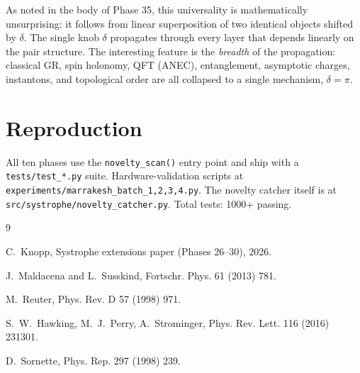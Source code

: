 \documentclass[11pt,a4paper]{article}
\begin{document}
As noted in the body of Phase 35, this universality is mathematically
unsurprising: it follows from linear superposition of two identical
objects shifted by $\delta$. The single knob $\delta$ propagates
through every layer that depends linearly on the pair structure.
The interesting feature is the \emph{breadth} of the propagation:
classical GR, spin holonomy, QFT (ANEC), entanglement, asymptotic
charges, instantons, and topological order are all collapsed to a
single mechanism, $\delta = \pi$.

\section{Reproduction}

All ten phases use the \texttt{novelty\_scan()} entry point and ship
with a \texttt{tests/test\_*.py} suite. Hardware-validation scripts
at \texttt{experiments/marrakesh\_batch\_{1,2,3,4}.py}. The novelty
catcher itself is at \texttt{src/systrophe/novelty\_catcher.py}.
Total tests: 1000+ passing.


\begin{thebibliography}{9}

C.~Knopp, Systrophe extensions paper (Phases 26--30), 2026.

J.~Maldacena and L.~Susskind, Fortschr. Phys. 61 (2013) 781.

M.~Reuter, Phys. Rev. D 57 (1998) 971.

S.~W.~Hawking, M.~J.~Perry, A.~Strominger, Phys. Rev. Lett. 116 (2016) 231301.

D.~Sornette, Phys. Rep. 297 (1998) 239.

\end{thebibliography}
\end{document}
